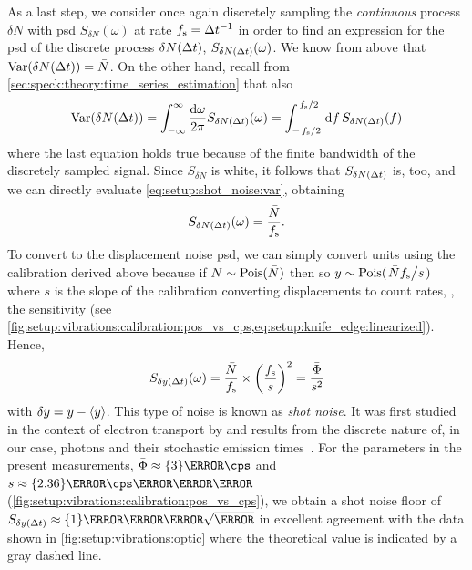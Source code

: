 As a last step, we consider once again discretely sampling the \emph{continuous} process $\delta N$ with \gls{psd} $S_{\delta N}(\omega)$ at rate $f_{\mathrm{s}}=\Delta t^{-1}$ in order to find an expression for the \gls{psd} of the discrete process $\delta N(\Delta t)$, $S_{\delta N(\Delta t)}(\omega)$.
We know from above that $\operatorname{Var}(\delta N(\Delta t)) = \bar{N}$.
On the other hand, recall from \cref{sec:speck:theory:time_series_estimation} that also
\begin{align}\label{eq:setup:shot_noise:var}
    \variance(\delta N(\dt)) = \intinf\ddf{\omega} S_{\delta N(\dt)}(\omega) = \int_{-\flatfrac{\fs}{2}}^{\flatfrac{\fs}{2}}\dd{f} S_{\delta N(\dt)}(f)
\end{align}
where the last equation holds true because of the finite bandwidth of the discretely sampled signal.
Since $S_{\delta N}$ is white, it follows that $S_{\delta N(\Delta t)}$ is, too, and we can directly evaluate \cref{eq:setup:shot_noise:var}, obtaining
\begin{equation}\label{eq:setup:shot_noise:psd}
    S_{\delta N(\Delta t)}(\omega) = \frac{\bar{N}}{f_{\mathrm{s}}}.
\end{equation}
To convert to the displacement noise \gls{psd}, we can simply convert units using the calibration derived above because if $N\sim\operatorname{Pois}(\bar{N})$ then so $y\sim\poisson(\flatfrac{\bar{N}\fs}{s})$ where $s$ is the slope of the calibration converting displacements to count rates, \ie, the sensitivity (see \cref{fig:setup:vibrations:calibration:pos_vs_cps,eq:setup:knife_edge:linearized}).
Hence,
\begin{equation}\label{eq:setup:shot_noise:noise_floor}
   S_{\delta y(\Delta t)}(\omega) = \frac{\bar{N}}{f_{\mathrm{s}}}\times\left(\frac{f_{\mathrm{s}}}{s}\right)^2 = \frac{\bar{\Phi}}{s^2}
\end{equation}
with $\delta y = y - \expval{y}$.
This type of noise is known as \emph{shot noise}.
It was first studied in the context of electron transport by \citet{Schottky1918} and results from the discrete nature of, in our case, photons and their stochastic emission times~\cite{Blanter2000}.
For the parameters in the present measurements, $\bar{\Phi}\approx\qty{3}{\mega\cps}$ and $s\approx\qty{2.36}{\mega\cps\per\micro\meter}$ (\cf \cref{fig:setup:vibrations:calibration:pos_vs_cps}), we obtain a shot noise floor of $S_{\delta y(\dt)}\approx\qty{1}{\nano\meter\per\sqrt{\hertz}}$ in excellent agreement with the data shown in \cref{fig:setup:vibrations:optic} where the theoretical value is indicated by a gray dashed line.

